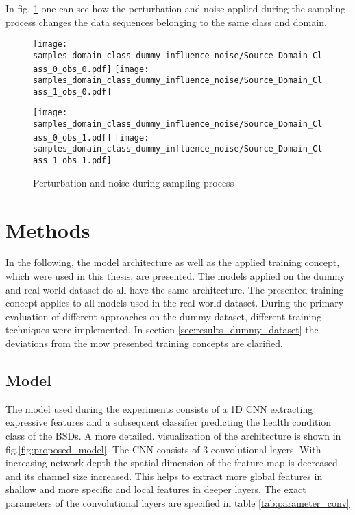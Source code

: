 In fig. \ref{fig:samples_domain_class_dummy_influence_noise} one can see how the perturbation and noise applied during the sampling process changes the data sequences belonging to the same class and domain. 

\begin{figure}[H]
  \centering
  \texttt{[image: samples\_domain\_class\_dummy\_influence\_noise/Source\_Domain\_Class\_0\_obs\_0.pdf]}
  \hspace{.3cm}
  \texttt{[image: samples\_domain\_class\_dummy\_influence\_noise/Source\_Domain\_Class\_1\_obs\_0.pdf]}

  \vspace{.3cm}

  \texttt{[image: samples\_domain\_class\_dummy\_influence\_noise/Source\_Domain\_Class\_0\_obs\_1.pdf]}
  \hspace{.3cm}
  \texttt{[image: samples\_domain\_class\_dummy\_influence\_noise/Source\_Domain\_Class\_1\_obs\_1.pdf]}

  \caption{Perturbation and noise during sampling process}
  \label{fig:samples_domain_class_dummy_influence_noise}
\end{figure}

\section{Methods}\label{chapter:introduction}
In the following, the model architecture as well as the applied training concept, which were used in this thesis, are presented. The models applied on the dummy and real-world dataset do all have the same architecture. The presented training concept applies to all models used in the real world dataset. During the primary evaluation of different approaches on the dummy dataset, different training techniques were implemented. In section \ref{sec:results_dummy_dataset} the deviations from the mow presented training concepts are clarified.

\subsection{Model}
\label{sec:model}
The model used during the experiments consists of a 1D CNN extracting expressive features and a subsequent classifier predicting the health condition class of the BSDs. A more detailed. visualization of the architecture is shown in fig.\ref{fig:proposed_model}. The CNN consists of 3 convolutional layers. With increasing network depth the spatial dimension of the feature map is decreased and its channel size increased. This helps to extract more global features in shallow and more specific and local features in deeper layers. The exact parameters of the convolutional layers are specified in table \ref{tab:parameter_conv} 

